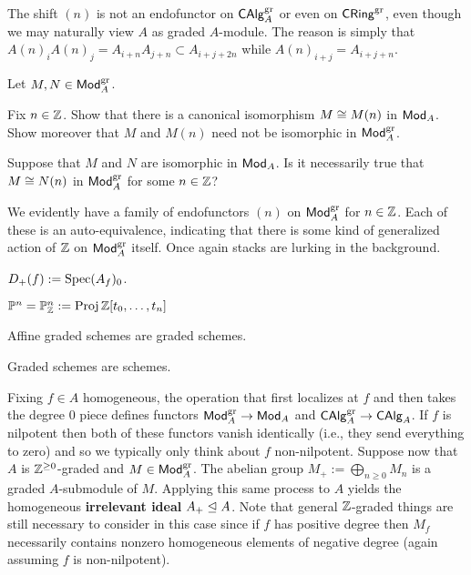 \documentclass[11pt]{article}
\renewcommand{\P}{\mathbb{P}}
\begin{document}
\begin{remark}
The shift $(n)$ is not an endofunctor on $\operatorname{\mathsf{CAlg}}_A^{\operatorname{gr}}$ or even on $\operatorname{\mathsf{CRing}}^{\operatorname{gr}}$, even though we may naturally view $A$ as graded $A$-module. The reason is simply that $A(n)_iA(n)_j=A_{i+n}A_{j+n}\subset A_{i+j+2n}$ while $A(n)_{i+j}=A_{i+j+n}$.
\end{remark}

\begin{exercise}
Let $M,N\in\operatorname{\mathsf{Mod}}_A^{\operatorname{gr}}$.
\begin{enum}{\alph}
\item Fix $n\in\mathbb{Z}$. Show that there is a canonical isomorphism $M\cong M(n)$ in $\operatorname{\mathsf{Mod}}_A$. Show moreover that $M$ and $M(n)$ need not be isomorphic in $\operatorname{\mathsf{Mod}}_A^{\operatorname{gr}}$.

\item Suppose that $M$ and $N$ are isomorphic in $\operatorname{\mathsf{Mod}}_A$. Is it necessarily true that $M\cong N(n)$ in $\operatorname{\mathsf{Mod}}_A^{\operatorname{gr}}$ for some $n\in\mathbb{Z}$?
\end{enum}
\end{exercise}

\begin{remark}
We evidently have a family of endofunctors $(n)$ on $\operatorname{\mathsf{Mod}}_A^{\operatorname{gr}}$ for $n\in\mathbb{Z}$. Each of these is an auto-equivalence, indicating that there is some kind of generalized action of $\mathbb{Z}$ on $\operatorname{\mathsf{Mod}}_A^{\operatorname{gr}}$ itself. Once again stacks are lurking in the background.
\end{remark}

$D_+(f):=\operatorname{Spec}(A_f)_0$.

$\P^n=\P_{\Z}^n:=\Proj\Z[t_0,\ldots,t_n]$

\begin{theorem}
Affine graded schemes are graded schemes.
\end{theorem}

\begin{theorem}
Graded schemes are schemes.
\end{theorem}

Fixing $f\in A$ homogeneous, the operation that first localizes at $f$ and then takes the degree $0$ piece defines functors $\operatorname{\mathsf{Mod}}_A^{\operatorname{gr}}\to\operatorname{\mathsf{Mod}}_A$ and $\operatorname{\mathsf{CAlg}}_A^{\operatorname{gr}}\to\operatorname{\mathsf{CAlg}}_A$. If $f$ is nilpotent then both of these functors vanish identically (i.e., they send everything to zero) and so we typically only think about $f$ non-nilpotent. Suppose now that $A$ is $\mathbb{Z}^{\geq0}$-graded and $M\in\operatorname{\mathsf{Mod}}_A^{\operatorname{gr}}$. The abelian group $M_+:=\bigoplus_{n\geq0}M_n$ is a graded $A$-submodule of $M$. Applying this same process to $A$ yields the homogeneous \textbf{irrelevant ideal} $A_+\trianglelefteq A$. Note that general $\mathbb{Z}$-graded things are still necessary to consider in this case since if $f$ has positive degree then $M_f$ necessarily contains nonzero homogeneous elements of negative degree (again assuming $f$ is non-nilpotent).
\end{document}
